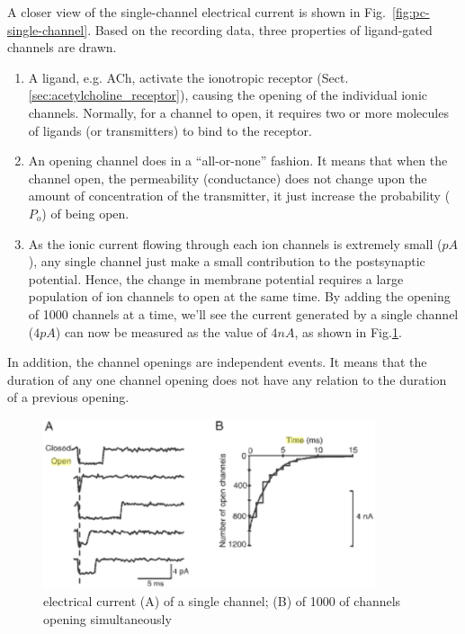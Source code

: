 A closer view of the single-channel electrical current is shown in
Fig.~\ref{fig:pc-single-channel}. Based on the recording data, three properties
of ligand-gated channels are drawn.
\begin{enumerate}
  
  \item A ligand, e.g. ACh, activate the ionotropic receptor
  (Sect.\ref{sec:acetylcholine_receptor}), causing the opening of the individual
  ionic channels. Normally, for a channel to open, it requires two or more
  molecules of ligands (or  transmitters) to bind to the receptor.

  \item An opening channel does in a ``all-or-none'' fashion. It means
  that when the channel open, the permeability (conductance) does not
  change upon the amount of concentration of the transmitter, it just
  increase the probability ($P_o$) of being open.

\item As the ionic current flowing through each ion channels is
  extremely small ($pA$), any single channel just make a small
  contribution to the postsynaptic potential. Hence, the change in
  membrane potential requires a large population of ion channels to
  open at the same time. By adding the opening of 1000 channels at a
  time, we'll see the current generated by a single channel ($4 pA$)
  can now be measured as the value of $4 nA$, as shown in
  Fig.\ref{fig:pc-multiple-channels}.

\end{enumerate}
In addition, the channel openings are independent events. It means
that the duration of any one channel opening does not have any
relation to the duration of a previous opening.

\begin{figure}[hbt]
 \centerline{\includegraphics[height=5cm]{./images/channel-currents.eps}}
 \caption{electrical current (A) of a single channel; (B) of 1000 of
   channels opening simultaneously}
\label{fig:pc-multiple-channels}
\end{figure}

